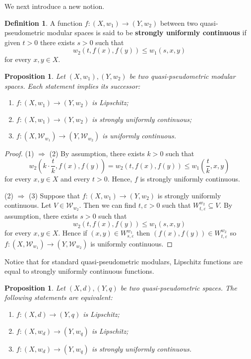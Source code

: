 \documentclass[11pt,a4paper]{amsart}
\newtheorem{proposition}[theorem]{Proposition}
\theoremstyle{definition}
\newtheorem{definition}[theorem]{Definition}
\begin{document}
	We next introduce a new notion.
	
	
	\begin{definition}
		A function $f:(X,w_1)\to (Y,w_2)$ between two quasi-pseudometric modular spaces is said to be \textbf{strongly uniformly continuous} if given $t>0$ there exists $s>0$ such that
		$$w_2(t,f(x),f(y))\leq w_1(s,x,y)$$
		for every $x,y\in X.$
	\end{definition}
	
	\begin{proposition}
		Let $(X,w_1), (Y,w_2)$ be two quasi-pseudometric modular spaces. Each statement implies its successor:
		\begin{enumerate}[(1)]
			\item $f:(X,w_1)\to (Y,w_2)$ is Lipschitz;
			\item $f:(X,w_1)\to (Y,w_2)$ is strongly uniformly continuous;
			\item $f:(X,\mathcal{W}_{w_1})\to (Y,\mathcal{W}_{w_2})$ is uniformly continuous.
		\end{enumerate}
	\end{proposition}
	
	\begin{proof}
		(1) $\Rightarrow$ (2) By assumption, there exists $k>0$ such that
		$$w_2\left(k\cdot \frac{t}{k},f(x),f(y)\right)=w_2(t,f(x),f(y))\leq w_1\left(\frac{t}{k},x,y\right)$$
		for every $x,y\in X$ and every $t>0.$ Hence, $f$ is strongly uniformly continuous.
		
		(2) $\Rightarrow$ (3) Suppose that $f:(X,w_1)\to (Y,w_2)$ is strongly uniformly continuous. Let $V\in \mathcal{W}_{w_2}$. Then we can find $t,\varepsilon>0$ such that $W^{w_2}_{t,\varepsilon}\subseteq V.$
		By assumption, there exists $s>0$ such that
		$$w_2(t,f(x),f(y))\leq w_1(s,x,y)$$
		for every $x,y\in X.$ Hence if $(x,y)\in W^{w_1}_{s,\varepsilon}$ then $(f(x),f(y))\in  W^{w_2}_{t,\varepsilon}$ so  $f:(X,\mathcal{W}_{w_1})\to (Y,\mathcal{W}_{w_2})$ is uniformly continuous.
	\end{proof}
	
	
	
	Notice that for standard quasi-pseudometric modulars, Lipschitz functions are equal to strongly uniformly continuous functions. 
	
	\begin{proposition}
		Let $(X,d), (Y,q)$ be two quasi-pseudometric spaces. The following statements are equivalent:
		\begin{enumerate}[(1)]
			\item $f:(X,d)\to (Y,q)$ is Lipschitz;
			\item $f:(X,w_d)\to (Y,w_q)$ is Lipschitz;
			\item $f:(X,w_d)\to (Y,w_q)$ is strongly uniformly continuous.
		\end{enumerate}
	\end{proposition}
	
\end{document}
